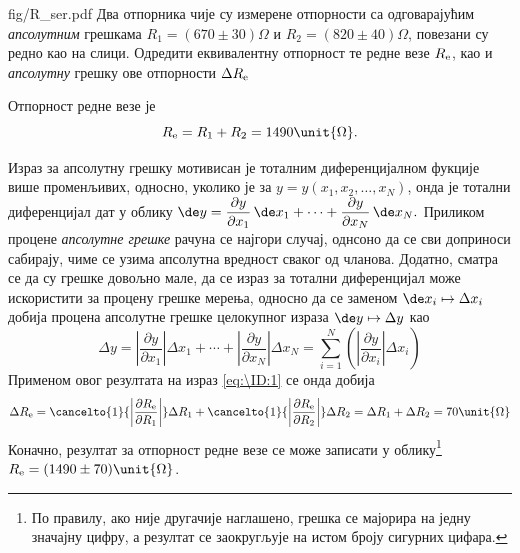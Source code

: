 \begin{slikaDesno}{fig/R_ser.pdf}
\PID \label{rser}
Два отпорника чије су измерене отпорности са одговарајућим \textit{апсолутним} грешкама 
$R_1 = (670 \pm 30)\unit{\Omega}$ и 
$R_2 = (820 \pm 40)\unit{\Omega}$, повезани су редно као на слици. 
Одредити еквивалентну отпорност те редне везе $R_{\rm e}$, као и \textit{апсолутну} 
грешку ове отпорности $\Delta R_{\rm e}$ 
\end{slikaDesno}

Отпорност редне везе је 
\begin{equation}
    R_{\rm e} = R_1 + R_2 = 1490\unit{\Omega}. \label{eq:\ID:1}
\end{equation}

Израз за апсолутну грешку мотивисан је тоталним диференцијалном фукције више променљивих, односно, 
уколико је за $y = y(x_1, x_2, \ldots, x_N)$, онда је тотални диференцијал дат у облику 
$
\de y = \dfrac{\partial y}{\partial x_1} \, \de x_1 + \cdots + \dfrac{\partial y}{\partial x_N} \, \de x_N.
$
Приликом процене \textit{апсолутне грешке} рачуна се најгори случај, однсоно да се сви доприноси сабирају, чиме 
се узима апсолутна вредност сваког од чланова. Додатно, сматра се да су грешке довољно мале, да се 
израз за тотални диференцијал може искористити за процену грешке мерења, односно да се заменом 
$\de x_i \mapsto \Delta x_i$ добија процена апсолутне грешке целокупног израза $\de y \mapsto \Delta y$ као 
\begin{equation}
    \Delta y = \left| \dfrac{\partial y}{\partial x_1} \right| \Delta x_1 +
    \cdots + \left| \dfrac{\partial y}{\partial x_N} \right| \Delta x_N 
    = \sum_{i = 1}^N \left(\left| \dfrac{\partial y}{\partial x_i} \right| \Delta x_i  \right)
    \label{eq:def_aps_greska}
\end{equation}
Применом овог резултата на израз \eqref{eq:\ID:1} се онда добија 
\begin{equation}
    \Delta R_{\rm e} 
    = 
    \cancelto{1}{\left| \dfrac{\partial R_{\rm e}}{\partial R_1}  \right|}
    \Delta R_1
    +
    \cancelto{1}{\left| \dfrac{\partial R_{\rm e}}{\partial R_2}  \right|}
    \Delta R_2 
    = \Delta R_1 + \Delta R_2 = 70\unit{\Omega}
\end{equation}
Коначно, резултат за отпорност редне везе се може записати у облику\footnote{По правилу, ако није другачије 
наглашено, грешка се мајорира на једну значајну цифру, а резултат се заокругљује на истом броју 
сигурних цифара.} 
$R_{\rm e} = (1490 \pm 70)\unit{\Omega}$. 